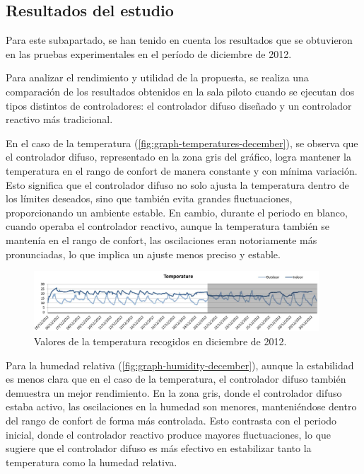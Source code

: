 \subsection{Resultados del estudio}

Para este subapartado, se han tenido en cuenta los resultados que se obtuvieron en las pruebas experimentales en el período de diciembre de 2012.

Para analizar el rendimiento y utilidad de la propuesta, se realiza una comparación de los resultados obtenidos en la sala piloto cuando se ejecutan dos tipos distintos de controladores: el controlador difuso diseñado y un controlador reactivo más tradicional.

En el caso de la temperatura (\autoref{fig:graph-temperatures-december}), se observa que el controlador difuso, representado en la zona gris del gráfico, logra mantener la temperatura en el rango de confort de manera constante y con mínima variación. Esto significa que el controlador difuso no solo ajusta la temperatura dentro de los límites deseados, sino que también evita grandes fluctuaciones, proporcionando un ambiente estable. En cambio, durante el periodo en blanco, cuando operaba el controlador reactivo, aunque la temperatura también se mantenía en el rango de confort, las oscilaciones eran notoriamente más pronunciadas, lo que implica un ajuste menos preciso y estable.

\begin{figure}[H]
	\centering
	\includegraphics[width=0.95\textwidth]{imgs/graph-temperatures-december.JPG}
	\caption{Valores de la temperatura recogidos en diciembre de 2012.}
	\label{fig:graph-temperatures-december}
\end{figure}

Para la humedad relativa (\autoref{fig:graph-humidity-december}), aunque la estabilidad es menos clara que en el caso de la temperatura, el controlador difuso también demuestra un mejor rendimiento. En la zona gris, donde el controlador difuso estaba activo, las oscilaciones en la humedad son menores, manteniéndose dentro del rango de confort de forma más controlada. Esto contrasta con el periodo inicial, donde el controlador reactivo produce mayores fluctuaciones, lo que sugiere que el controlador difuso es más efectivo en estabilizar tanto la temperatura como la humedad relativa.

